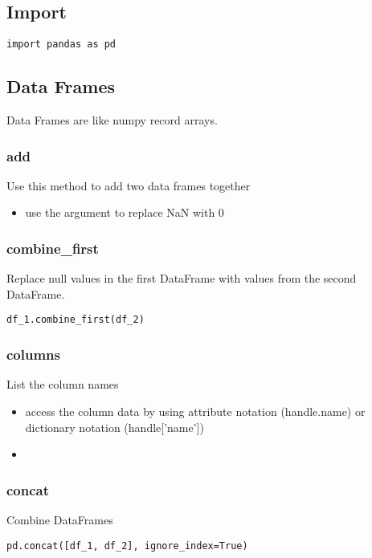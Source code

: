 \subsection{Import}
\begin{lstlisting}
import pandas as pd
\end{lstlisting}

\subsection{Data Frames}
Data Frames are like numpy record arrays.

%
\subsubsection{add}
Use this method to add two data frames together
  \begin{itemize}
    \item use the {\color{red}{fill\_value=0}} argument to replace NaN with 0
  \end{itemize}

%
\subsubsection{combine\_first}
Replace null values in the first DataFrame with values from the second
DataFrame.

{\color{red}{Note: If the first DataFrame is missing a row that exists in the
  second DataFrame that row will be added as well.}}
\begin{lstlisting}
df_1.combine_first(df_2)
\end{lstlisting}


%
\subsubsection{columns}
List the column names
  \begin{itemize}

    \item access the column data by using attribute notation (handle.name) or
      dictionary notation (handle['name'])

    \item \color{red}{If the column name is more than one word you must use
      the dictionary notation}
  \end{itemize}

%
\subsubsection{concat}
Combine DataFrames
\begin{lstlisting}
pd.concat([df_1, df_2], ignore_index=True)
\end{lstlisting}

